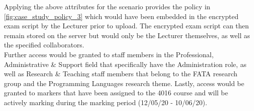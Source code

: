 Applying the above attributes for the scenario provides the policy in \cref{fig:case_study_policy_3} which would have been embedded in the encrypted exam script by the Lecturer prior to upload. The encrypted exam script can then remain stored on the server but would only be the Lecturer themselves, as well as the specified collaborators.\\
Further access would be granted to staff members in the Professional, Administrative \& Support field that specifically have the Administration role, as well as Research \& Teaching staff members that belong to the FATA research group and the Programming Languages research theme. Lastly, access would be granted to markers that have been assigned to the 4016 course and will be actively marking during the marking period (12/05/20 - 10/06/20).

